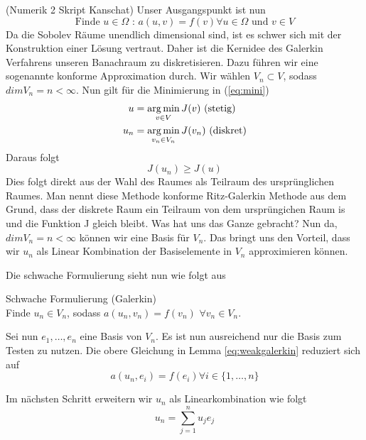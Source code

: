(Numerik 2 Skript Kanschat)
Unser Ausgangspunkt ist nun
\begin{equation}
\text{Finde } u \in \Omega \text{ : } a(u,v) = f(v) \forall u \in \Omega \text{ und } v \in V
\end{equation}
Da die Sobolev Räume unendlich dimensional sind, ist es schwer sich mit der Konstruktion einer Lösung vertraut. Daher ist die Kernidee des Galerkin Verfahrens unseren Banachraum zu diskretisieren. 
Dazu führen wir eine sogenannte konforme Approximation durch.
Wir wählen $V_{n} \subset V$, sodass $dim V_{n} = n < \infty $. Nun gilt für die Minimierung in (\ref{eq:mini})
\begin{equation*}
\begin{aligned}
u &= \operatorname*{arg\,min}_{v \in V} J(v)  \text{ (stetig)}\\
u_n &= \operatorname*{arg\,min}_{v_n \in V_n} J(v_n) \text{ (diskret)}
\end{aligned}
\end{equation*}
Daraus folgt
\begin{equation*}
J(u_n) \geq J(u)
\end{equation*}
Dies folgt direkt aus der Wahl des Raumes als Teilraum des ursprünglichen Raumes. Man nennt diese Methode konforme Ritz-Galerkin Methode aus dem Grund, dass der diskrete Raum ein Teilraum von dem ursprüngichen Raum is und die Funktion J gleich bleibt. 
Was hat uns das Ganze gebracht? Nun da, $dim V_n = n < \infty$ können wir eine Basis für $V_n$. Das bringt uns den Vorteil, dass wir $u_n$ als Linear Kombination der Basiselemente in $V_n$ approximieren können.

Die schwache Formulierung sieht nun wie folgt aus
\begin{Lemma} \label{eq:weakgalerkin} Schwache Formulierung (Galerkin) \\
Finde $u_n \in V_n$, sodass $a(u_n,v_n)=f(v_n)$ $\forall v_n \in V_n$.
\end{Lemma}

Sei nun $e_1, \dots , e_n$ eine Basis von $V_n$. Es ist nun ausreichend nur die Basis zum Testen zu nutzen.
Die obere Gleichung in Lemma \ref{eq:weakgalerkin} reduziert sich auf
\begin{equation} \label{eq:weak1}
a(u_n,e_i) = f(e_i) \forall i \in \{1,\dots,n\}
\end{equation}

Im nächsten Schritt erweitern wir $u_n$ als Linearkombination wie folgt
\begin{equation}
u_n = \sum_{j=1}^{n} u_j e_j
\end{equation}

